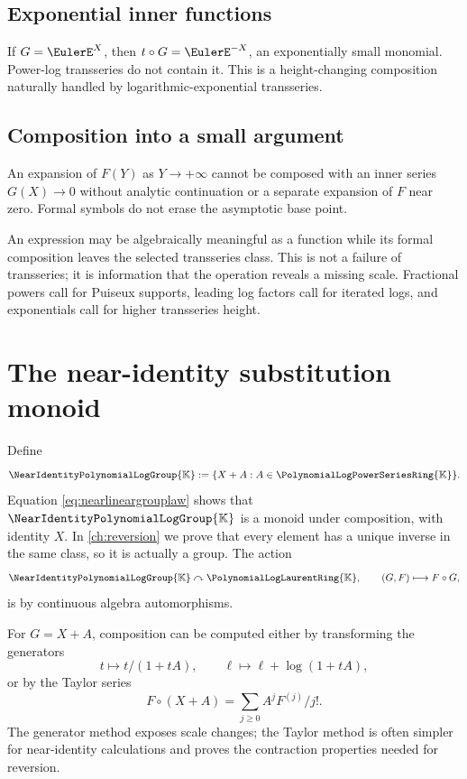 \documentclass[11pt,oneside,openany]{book}
\newcommand{\K}{\mathbb{K}}
\newcommand{\Rring}{\PolynomialLogPowerSeriesRing{\K}}
\newcommand{\Pring}{\PolynomialLogLaurentRing{\K}}
\newcommand{\Ggroup}{\NearIdentityPolynomialLogGroup{\K}}
\newcommand{\compose}{\mathbin{\circ}}
\begin{document}
\subsection{Exponential inner functions}
If \(G=\EulerE^X\), then \(t\compose G=\EulerE^{-X}\), an exponentially small
monomial.  Power-log transseries do not contain it.  This is a height-changing
composition naturally handled by logarithmic-exponential transseries.

\subsection{Composition into a small argument}
An expansion of \(F(Y)\) as \(Y\to+\infty\) cannot be composed with an inner
series \(G(X)\to0\) without analytic continuation or a separate expansion of
\(F\) near zero.  Formal symbols do not erase the asymptotic base point.

\begin{cautionbox}
An expression may be algebraically meaningful as a function while its formal
composition leaves the selected transseries class.  This is not a failure of
transseries; it is information that the operation reveals a missing scale.
Fractional powers call for Puiseux supports, leading log factors call for
iterated logs, and exponentials call for higher transseries height.
\end{cautionbox}

\section{The near-identity substitution monoid}
Define
\begin{equation}\label{eq:Ggroupdefpre}
 \Ggroup:=\{X+A:A\in\Rring\}.
\end{equation}
Equation \cref{eq:nearlineargrouplaw} shows that \(\Ggroup\) is a monoid under
composition, with identity \(X\).  In \cref{ch:reversion} we prove that every
element has a unique inverse in the same class, so it is actually a group.
The action
\[
 \Ggroup\curvearrowright\Pring,
 \qquad (G,F)\longmapsto F\compose G,
\]
is by continuous algebra automorphisms.

\begin{summarybox}
For \(G=X+A\), composition can be computed either by transforming the
generators
\[
 t\mapsto t/(1+tA),
 \qquad
 \ell\mapsto\ell+\log(1+tA),
\]
or by the Taylor series
\[
 F\compose(X+A)=\sum_{j\geq0}A^jF^{(j)}/j!.
\]
The generator method exposes scale changes; the Taylor method is often simpler
for near-identity calculations and proves the contraction properties needed
for reversion.
\end{summarybox}
\end{document}
